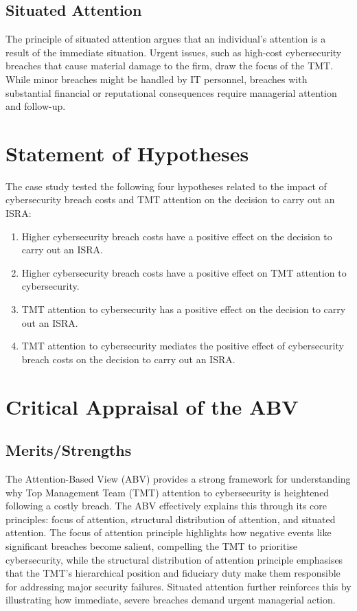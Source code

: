     \subsection{Situated Attention}
    The principle of situated attention argues that an individual's attention is a result of the immediate situation. Urgent issues, such as high-cost cybersecurity breaches that cause material damage to the firm, draw the focus of the TMT. While minor breaches might be handled by IT personnel, breaches with substantial financial or reputational consequences require managerial attention and follow-up.

\section{Statement of Hypotheses}
The case study tested the following four hypotheses related to the impact of cybersecurity breach costs and TMT attention on the decision to carry out an ISRA:
\begin{enumerate}
    \item Higher cybersecurity breach costs have a positive effect on the decision to carry out an ISRA.
    \item Higher cybersecurity breach costs have a positive effect on TMT attention to cybersecurity.
    \item TMT attention to cybersecurity has a positive effect on the decision to carry out an ISRA.
    \item TMT attention to cybersecurity mediates the positive effect of cybersecurity breach costs on the decision to carry out an ISRA.
\end{enumerate}

\section{Critical Appraisal of the ABV}

    \subsection{Merits/Strengths}
    The Attention-Based View (ABV) provides a strong framework for understanding why Top Management Team (TMT) attention to cybersecurity is heightened following a costly breach. The ABV effectively explains this through its core principles: focus of attention, structural distribution of attention, and situated attention. The focus of attention principle highlights how negative events like significant breaches become salient, compelling the TMT to prioritise cybersecurity, while the structural distribution of attention principle emphasises that the TMT's hierarchical position and fiduciary duty make them responsible for addressing major security failures. Situated attention further reinforces this by illustrating how immediate, severe breaches demand urgent managerial action.

